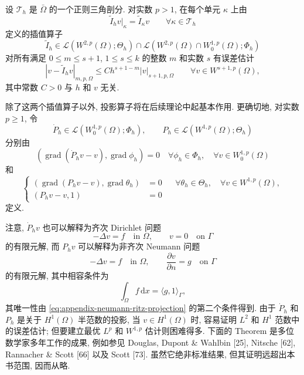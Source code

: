 \setcounter{statement}{3}
\begin{Lemma}\label{lem:appendix-moment-interpolant-global}
设 $\mathcal{T}_h$ 是 $\bar\Omega$ 的一个正则三角剖分.
对实数 $p>1$, 在每个单元 $\kappa$ 上由
\[
\widetilde I_hv|_\kappa
=
\widetilde I_\kappa v
\qquad
\forall\kappa\in\mathcal{T}_h
\]
定义的插值算子
\[
\widetilde I_h
\in
\mathcal{L}(W^{2,p}(\Omega);\Theta_h)
\cap
\mathcal{L}(W^{2,p}(\Omega)\cap W_0^{1,p}(\Omega);\Phi_h)
\]
对所有满足 $0\leq m\leq s+1$, $1\leq s\leq k$ 的整数 $m$
和实数 $s$ 有误差估计
\begin{equation}\label{eq:appendix-moment-interpolation-error}
|v-\widetilde I_hv|_{m,p,\Omega}
\leq
Ch^{s+1-m}|v|_{s+1,p,\Omega}
\qquad
\forall v\in W^{s+1,p}(\Omega),
\end{equation}
其中常数 $C>0$ 与 $h$ 和 $v$ 无关.
\end{Lemma}

除了这两个插值算子以外, 投影算子将在后续理论中起基本作用.
更确切地, 对实数 $p\geq1$, 令
\[
\dot P_h\in\mathcal{L}(W_0^{1,p}(\Omega);\Phi_h),
\qquad
P_h\in\mathcal{L}(W^{1,p}(\Omega);\Theta_h)
\]
分别由
\begin{equation}\label{eq:appendix-dirichlet-ritz-projection}
(\operatorname{grad}(\dot P_hv-v),
\operatorname{grad}\phi_h)=0
\quad
\forall\phi_h\in\Phi_h,
\quad
\forall v\in W_0^{1,p}(\Omega)
\end{equation}
和
\begin{equation}\label{eq:appendix-neumann-ritz-projection}
\left\{
\begin{aligned}
(\operatorname{grad}(P_hv-v),
\operatorname{grad}\theta_h)&=0
&&\forall\theta_h\in\Theta_h,
\quad\forall v\in W^{1,p}(\Omega),\\
(P_hv-v,1)&=0
\end{aligned}
\right.
\end{equation}
定义.

注意, $\dot P_hv$ 也可以解释为齐次 Dirichlet 问题
\[
-\Delta v=f\quad\text{in }\Omega,
\qquad
v=0\quad\text{on }\Gamma
\]
的有限元解, 而 $P_hv$ 可以解释为非齐次 Neumann 问题
\[
-\Delta v=f\quad\text{in }\Omega,
\qquad
\frac{\partial v}{\partial n}=g\quad\text{on }\Gamma
\]
的有限元解, 其中相容条件为
\[
\int_\Omega f\,\mathrm{d}x
=
\langle g,1\rangle_\Gamma,
\]
其唯一性由 \eqref{eq:appendix-neumann-ritz-projection} 的第二个条件得到.
由于 $\dot P_h$ 和 $P_h$ 是关于 $H^1(\Omega)$ 半范数的投影,
当 $v\in H^1(\Omega)$ 时, 容易证明 $L^2$ 和 $H^1$ 范数中的误差估计;
但要建立最优 $L^p$ 和 $W^{1,p}$ 估计则困难得多.
下面的 Theorem 是多位数学家多年工作的成果, 例如参见
Douglas, Dupont \& Wahlbin [25], Nitsche [62],
Rannacher \& Scott [66] 以及 Scott [73].
虽然它绝非标准结果, 但其证明远超出本书范围, 因而从略.

